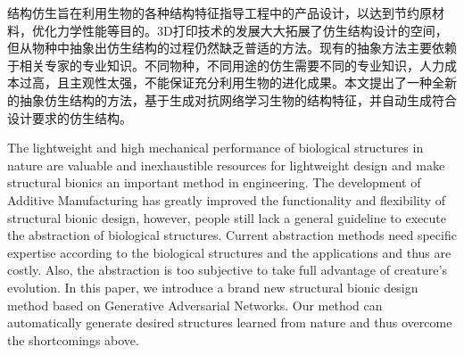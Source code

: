 \begin{cnabstract}
结构仿生旨在利用生物的各种结构特征指导工程中的产品设计，以达到节约原材料，优化力学性能等目的。3D打印技术的发展大大拓展了仿生结构设计的空间，但从物种中抽象出仿生结构的过程仍然缺乏普适的方法。现有的抽象方法主要依赖于相关专家的专业知识。不同物种，不同用途的仿生需要不同的专业知识，人力成本过高，且主观性太强，不能保证充分利用生物的进化成果。本文提出了一种全新的抽象仿生结构的方法，基于生成对抗网络学习生物的结构特征，并自动生成符合设计要求的仿生结构。

\end{cnabstract}
\begin{enabstract}
The lightweight and high mechanical performance of biological structures in nature are valuable and inexhaustible resources for lightweight design and make structural bionics an important method in engineering. The development of Additive Manufacturing has greatly improved the functionality and flexibility of structural bionic design, however, people still lack a general guideline to execute the abstraction of biological structures. Current abstraction methods need specific expertise according to the biological structures and the applications and thus are costly. Also, the abstraction is too subjective to take full advantage of creature's evolution. In this paper, we introduce a brand new structural bionic design method based on Generative Adversarial Networks. Our method can automatically generate desired structures learned from nature and thus overcome the shortcomings above.

\end{enabstract}
